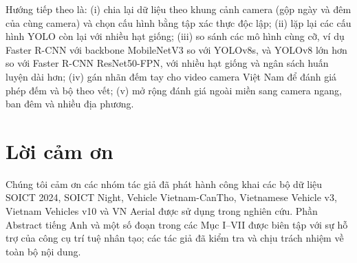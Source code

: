 \documentclass[10pt,journal,a4paper]{IEEEtran}
\begin{document}
Hướng tiếp theo là: (i) chia lại dữ liệu theo khung cảnh camera (gộp ngày và đêm của cùng camera) và chọn cấu hình bằng tập xác thực độc lập; (ii) lặp lại các cấu hình YOLO còn lại với nhiều hạt giống; (iii) so sánh các mô hình cùng cỡ, ví dụ Faster R-CNN với backbone MobileNetV3 so với YOLOv8s, và YOLOv8 lớn hơn so với Faster R-CNN ResNet50-FPN, với nhiều hạt giống và ngân sách huấn luyện dài hơn; (iv) gán nhãn đếm tay cho video camera Việt Nam để đánh giá phép đếm và bộ theo vết; (v) mở rộng đánh giá ngoài miền sang camera ngang, ban đêm và nhiều địa phương.

\section*{Lời cảm ơn}
Chúng tôi cảm ơn các nhóm tác giả đã phát hành công khai các bộ dữ liệu SOICT 2024, SOICT Night, Vehicle Vietnam-CanTho, Vietnamese Vehicle v3, Vietnam Vehicles v10 và VN Aerial được sử dụng trong nghiên cứu. Phần Abstract tiếng Anh và một số đoạn trong các Mục I--VII được biên tập với sự hỗ trợ của công cụ trí tuệ nhân tạo; các tác giả đã kiểm tra và chịu trách nhiệm về toàn bộ nội dung.
\end{document}
